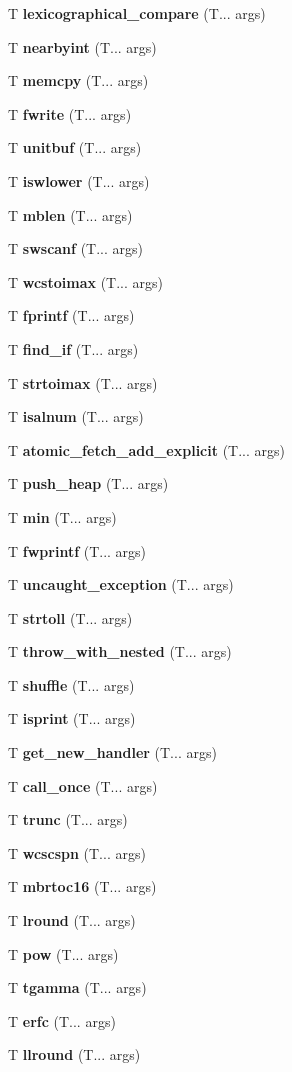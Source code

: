 \begin{DoxyCompactItemize}
T \textbf{ lexicographical\+\_\+compare} (T... args)
\item 
T \textbf{ nearbyint} (T... args)
\item 
T \textbf{ memcpy} (T... args)
\item 
T \textbf{ fwrite} (T... args)
\item 
T \textbf{ unitbuf} (T... args)
\item 
T \textbf{ iswlower} (T... args)
\item 
T \textbf{ mblen} (T... args)
\item 
T \textbf{ swscanf} (T... args)
\item 
T \textbf{ wcstoimax} (T... args)
\item 
T \textbf{ fprintf} (T... args)
\item 
T \textbf{ find\+\_\+if} (T... args)
\item 
T \textbf{ strtoimax} (T... args)
\item 
T \textbf{ isalnum} (T... args)
\item 
T \textbf{ atomic\+\_\+fetch\+\_\+add\+\_\+explicit} (T... args)
\item 
T \textbf{ push\+\_\+heap} (T... args)
\item 
T \textbf{ min} (T... args)
\item 
T \textbf{ fwprintf} (T... args)
\item 
T \textbf{ uncaught\+\_\+exception} (T... args)
\item 
T \textbf{ strtoll} (T... args)
\item 
T \textbf{ throw\+\_\+with\+\_\+nested} (T... args)
\item 
T \textbf{ shuffle} (T... args)
\item 
T \textbf{ isprint} (T... args)
\item 
T \textbf{ get\+\_\+new\+\_\+handler} (T... args)
\item 
T \textbf{ call\+\_\+once} (T... args)
\item 
T \textbf{ trunc} (T... args)
\item 
T \textbf{ wcscspn} (T... args)
\item 
T \textbf{ mbrtoc16} (T... args)
\item 
T \textbf{ lround} (T... args)
\item 
T \textbf{ pow} (T... args)
\item 
T \textbf{ tgamma} (T... args)
\item 
T \textbf{ erfc} (T... args)
\item 
T \textbf{ llround} (T... args)
\item 

\end{DoxyCompactItemize}
